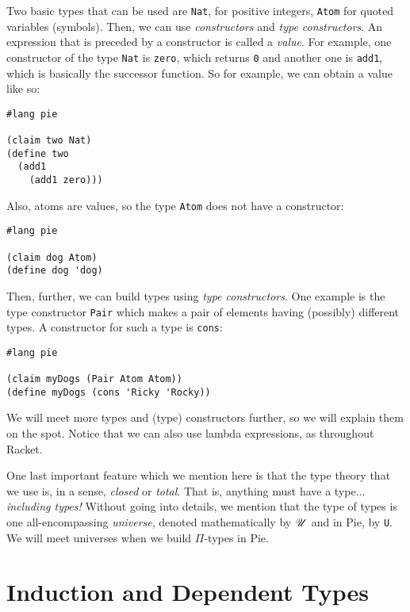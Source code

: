 
Two basic types that can be used are \texttt{Nat}, for positive integers,
\texttt{Atom} for quoted variables (symbols). Then, we can use
\emph{constructors} and \emph{type constructors}. An expression that is
preceded by a constructor is called a \emph{value}. For example, one constructor
of the type \texttt{Nat} is \texttt{zero}, which returns \texttt{0} and another
one is \texttt{add1}, which is basically the successor function. So for
example, we can obtain a value like so:
{
  \small
\begin{verbatim}
#lang pie

(claim two Nat)
(define two
  (add1
    (add1 zero)))
\end{verbatim}
}

Also, atoms are values, so the type \texttt{Atom} does not have a constructor:
{
  \small
\begin{verbatim}
#lang pie

(claim dog Atom)
(define dog 'dog)
\end{verbatim}
}

Then, further, we can build types using \emph{type constructors}. One example
is the type constructor \texttt{Pair} which makes a pair of elements having
(possibly) different types. A constructor for such a type is \texttt{cons}:
{
  \small
\begin{verbatim}
#lang pie

(claim myDogs (Pair Atom Atom))
(define myDogs (cons 'Ricky 'Rocky))
\end{verbatim}
}

We will meet more types and (type) constructors further, so we will explain
them on the spot. Notice that we can also use lambda expressions, as
throughout Racket.

One last important feature which we mention here is that the type theory that
we use is, in a sense, \emph{closed} or \emph{total}. That is, anything must
have a type... \emph{including types!} Without going into details, we mention
that the type of types is one all-encompassing \emph{universe}, denoted
mathematically by $ \mathscr{U} $ and in Pie, by \texttt{U}. We will meet universes
when we build $ \Pi $-types in Pie.

\section{Induction and Dependent Types}
\label{sec:induction-pi}

